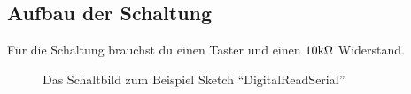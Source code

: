 \subsection{Aufbau der Schaltung}
Für die Schaltung brauchst du einen Taster und einen $10\text{k}\Omega$ Widerstand. 
\begin{figure}[h]
\begin{center}

\qquad
{}
\caption{Das Schaltbild zum Beispiel Sketch ``DigitalReadSerial''}
\label{fig:digitalreadserial_schaltung}
\end{center}
\end{figure}



